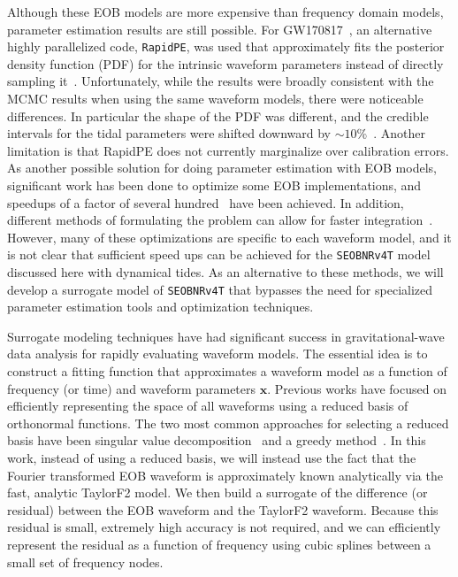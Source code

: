\documentclass[prd,aps,letter,twocolumn,floatfix,notitlepage,nofootinbib]{revtex4-1}
\def\bx{\mathbf{x}}
\begin{document}
Although these EOB models are more expensive than frequency domain models, parameter estimation results are still possible. For GW170817~\cite{BNSPE}, an alternative highly parallelized code, \texttt{RapidPE}, was used that approximately fits the posterior density function (PDF) for the intrinsic waveform parameters instead of directly sampling it~\cite{PankowBradyOchsner2015, LangeOshaughnessyRizzo2018}. Unfortunately, while the results were broadly consistent with the MCMC results when using the same waveform models, there were noticeable differences. In particular the shape of the PDF was different, and the credible intervals for the tidal parameters were shifted downward by $\sim 10$\%~\cite{BNSPE}. Another limitation is that RapidPE does not currently marginalize over calibration errors. As another possible solution for doing parameter estimation with EOB models, significant work has been done to optimize some EOB implementations, and speedups of a factor of several hundred~\cite{DevineEtienneMcWilliams2016} have been achieved. In addition, different methods of formulating the problem can allow for faster integration~\cite{NagarNettegno2018}. However, many of these optimizations are specific to each waveform model, and it is not clear that sufficient speed ups can be achieved for the \texttt{SEOBNRv4T} model discussed here with dynamical tides. As an alternative to these methods, we will develop a surrogate model of \texttt{SEOBNRv4T} that bypasses the need for specialized parameter estimation tools and optimization techniques. 



Surrogate modeling techniques have had significant success in gravitational-wave data analysis for rapidly evaluating waveform models. The essential idea is to construct a fitting function that approximates a waveform model as a function of frequency (or time) and waveform parameters $\bx$. Previous works have focused on efficiently representing the space of all waveforms using a reduced basis of orthonormal functions.
The two most common approaches for selecting a reduced basis have been singular value decomposition~\cite{Puerrer2014, Puerrer2015} and a greedy method~\cite{FieldGalleyHesthaven2014, LackeyBernuzziGalley2017, BlackmanFieldGalley2015, BlackmanFieldScheel2017a, BlackmanFieldScheel2017b}.
In this work, instead of using a reduced basis, we will instead use the fact that the Fourier transformed EOB waveform is approximately known analytically via the fast, analytic TaylorF2 model. We then build a surrogate of the difference (or residual) between the EOB waveform and the TaylorF2 waveform. Because this residual is small, extremely high accuracy is not required, and we can efficiently represent the residual as a function of frequency using cubic splines between a small set of frequency nodes.
\end{document}
